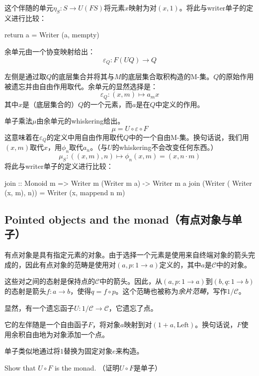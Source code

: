 \documentclass[DaoFP]{subfiles}
\begin{document}
    这个伴随的单元$\eta_S \colon S \to U (F S)$将元素$x$映射为对$(x, 1)$。将此与writer单子的定义进行比较：
    \begin{haskell}
        return a = Writer (a, mempty)
    \end{haskell}

    余单元由一个协变映射给出：
    \[ \varepsilon_Q \colon F (U Q) \to Q \]

    左侧是通过取$Q$的底层集合并将其与$M$的底层集合取积构造的M-集。$Q$的原始作用被遗忘并由自由作用取代。余单元的显然选择是：
    \[ \varepsilon_Q \colon (x, m) \mapsto a_m x \]
    其中$x$是（底层集合的）$Q$的一个元素，而$a$是在$Q$中定义的作用。

    单子乘法$\mu$由余单元的whiskering给出。
    \[ \mu = U \circ \varepsilon \circ F \]
    这意味着在$\varepsilon_Q$的定义中用自由作用取代$Q$中的一个自由M-集。换句话说，我们用$(x, m)$取代$x$，用$\phi_n$取代$a_n$。（与$U$的whiskering不会改变任何东西。）
    \[ \mu_S \colon ((x, m), n) \mapsto \phi_n (x, m) = (x, n \cdot m) \]
    将此与writer单子的定义进行比较：
    \begin{haskell}
        join :: Monoid m => Writer m (Writer m a) -> Writer m a
        join (Writer ( Writer (x, m), n)) = Writer (x, mappend n m)
    \end{haskell}

    \subsection{Pointed objects and the  monad（有点对象与单子）}

    有点对象是具有指定元素的对象。由于选择一个元素是使用来自终端对象的箭头完成的，因此有点对象的范畴是使用对$(a, p \colon 1 \to a)$定义的，其中$a$是$\mathcal{C}$中的对象。

    这些对之间的态射是保持点的$\mathcal{C}$中的箭头。因此，从$(a, p \colon 1 \to a)$到$(b, q \colon 1 \to b)$的态射是箭头$f \colon a \to b$，使得$q = f \circ p$。这个范畴也被称为\emph{余片范畴}，写作$1/\mathcal{C}$。

    显然，有一个遗忘函子$U \colon 1/\mathcal{C} \to \mathcal{C}$，它遗忘了点。

    它的左伴随是一个自由函子$F$，将对象$a$映射到对$(1 + a, \text{Left})$。换句话说，$F$使用余积自由地为对象添加一个点。

    单子类似地通过将$1$替换为固定对象$e$来构造。

    \begin{exercise}
        Show that $U \circ F$ is the  monad.
        （证明$U \circ F$是单子）
    \end{exercise}
\end{document}
